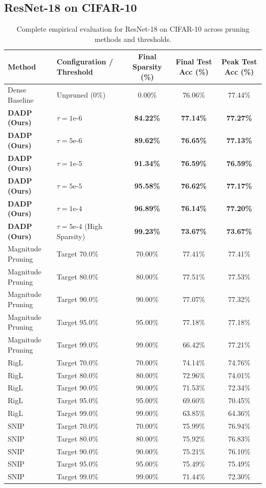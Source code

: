 \subsection{ResNet-18 on CIFAR-10}

\begin{table}[H]
\caption{Complete empirical evaluation for ResNet-18 on CIFAR-10 across pruning methods and thresholds.}
\label{tab:app_resnet_cifar}
\centering
\small
\begin{tabular}{llccc}
\toprule
\textbf{Method} & \textbf{Configuration / Threshold} & \textbf{Final Sparsity (\%)} & \textbf{Final Test Acc (\%)} & \textbf{Peak Test Acc (\%)} \\
\midrule
Dense Baseline & Unpruned (0\%) & 0.00\% & 76.06\% & 77.44\% \\
\textbf{DADP (Ours)} & $\tau = 1\text{e-}6$ & \textbf{84.22\%} & \textbf{77.14\%} & \textbf{77.27\%} \\
\textbf{DADP (Ours)} & $\tau = 5\text{e-}6$ & \textbf{89.62\%} & \textbf{76.65\%} & \textbf{77.13\%} \\
\textbf{DADP (Ours)} & $\tau = 1\text{e-}5$ & \textbf{91.34\%} & \textbf{76.59\%} & \textbf{76.59\%} \\
\textbf{DADP (Ours)} & $\tau = 5\text{e-}5$ & \textbf{95.58\%} & \textbf{76.62\%} & \textbf{77.17\%} \\
\textbf{DADP (Ours)} & $\tau = 1\text{e-}4$ & \textbf{96.89\%} & \textbf{76.14\%} & \textbf{77.20\%} \\
\textbf{DADP (Ours)} & $\tau = 5\text{e-}4$ (High Sparsity) & \textbf{99.23\%} & \textbf{73.67\%} & \textbf{73.67\%} \\
\midrule
Magnitude Pruning & Target 70.0\% & 70.00\% & 77.41\% & 77.41\% \\
Magnitude Pruning & Target 80.0\% & 80.00\% & 77.51\% & 77.53\% \\
Magnitude Pruning & Target 90.0\% & 90.00\% & 77.07\% & 77.32\% \\
Magnitude Pruning & Target 95.0\% & 95.00\% & 77.18\% & 77.18\% \\
Magnitude Pruning & Target 99.0\% & 99.00\% & 66.42\% & 77.21\% \\
\midrule
RigL & Target 70.0\% & 70.00\% & 74.14\% & 74.76\% \\
RigL & Target 80.0\% & 80.00\% & 72.96\% & 74.01\% \\
RigL & Target 90.0\% & 90.00\% & 71.53\% & 72.34\% \\
RigL & Target 95.0\% & 95.00\% & 69.60\% & 70.45\% \\
RigL & Target 99.0\% & 99.00\% & 63.85\% & 64.36\% \\
\midrule
SNIP & Target 70.0\% & 70.00\% & 75.99\% & 76.94\% \\
SNIP & Target 80.0\% & 80.00\% & 75.92\% & 76.83\% \\
SNIP & Target 90.0\% & 90.00\% & 75.21\% & 76.10\% \\
SNIP & Target 95.0\% & 95.00\% & 75.49\% & 75.49\% \\
SNIP & Target 99.0\% & 99.00\% & 71.44\% & 72.30\% \\
\bottomrule
\end{tabular}
\end{table}

